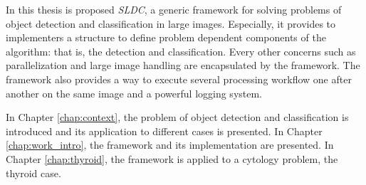 In this thesis is proposed \textit{SLDC}, a generic framework for solving problems of object detection and classification in large images. Especially, it provides to implementers a structure to define problem dependent components of the algorithm: that is, the detection and classification. Every other concerns such as parallelization and large image handling are encapsulated by the framework. The framework also provides a way to execute several processing workflow one after another on the same image and a powerful logging system. 

In Chapter \ref{chap:context}, the problem of object detection and classification is introduced and its application to different cases is presented. In Chapter \ref{chap:work_intro}, the framework and its implementation are presented. In Chapter \ref{chap:thyroid}, the framework is applied to a cytology problem, the thyroid case.